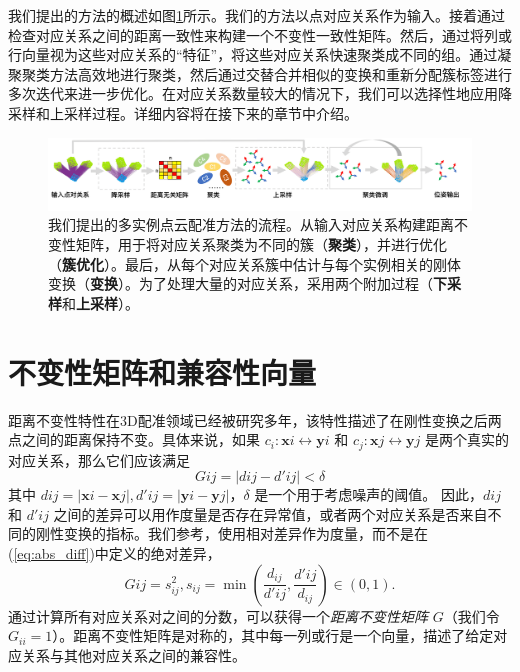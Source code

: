 我们提出的方法的概述如图\ref{fig:pipeline}所示。我们的方法以点对应关系作为输入。接着通过检查对应关系之间的距离一致性来构建一个不变性一致性矩阵。然后，通过将列或行向量视为这些对应关系的“特征”，将这些对应关系快速聚类成不同的组。通过凝聚聚类方法高效地进行聚类，然后通过交替合并相似的变换和重新分配簇标签进行多次迭代来进一步优化。在对应关系数量较大的情况下，我们可以选择性地应用降采样和上采样过程。详细内容将在接下来的章节中介绍。

\begin{figure}[ht]
    \centering
    \includegraphics[width=1\textwidth]{images/pipeline.png} %
    \caption{我们提出的多实例点云配准方法的流程。从输入对应关系构建距离不变性矩阵，用于将对应关系聚类为不同的簇（\textbf{聚类}），并进行优化（\textbf{簇优化}）。最后，从每个对应关系簇中估计与每个实例相关的刚体变换（\textbf{变换}）。为了处理大量的对应关系，采用两个附加过程（\textbf{下采样}和\textbf{上采样}）。}
    \label{fig:pipeline}
    \vspace{-0.6in}
\end{figure}

\section{不变性矩阵和兼容性向量}
\label{subsec:Distance-Consistency-Graph}
距离不变性特性在3D配准领域已经被研究多年\cite{TEASER}\cite{shi2021robin}\cite{leordeanu2005spectral}，该特性描述了在刚性变换之后两点之间的距离保持不变。具体来说，如果 $c_i :\mathbf{x}i \leftrightarrow \mathbf{y}i$ 和 $c_j : \mathbf{x}j \leftrightarrow \mathbf{y}j$ 是两个真实的对应关系，那么它们应该满足
%
\begin{equation}
G{ij}=|d{ij} - d'{ij} | < \delta
\label{eq:abs_diff}
\end{equation}
其中 $d{ij} = |\mathbf{x}i-\mathbf{x}j|, d'{ij}=|\mathbf{y}i -\mathbf{y}j|$，$\delta $ 是一个用于考虑噪声的阈值。
因此，$d{ij}$ 和 $d'{ij}$ 之间的差异可以用作度量是否存在异常值，或者两个对应关系是否来自不同的刚性变换的指标。我们参考\cite{matrix}，使用相对差异作为度量，而不是在(\ref{eq:abs_diff})中定义的绝对差异，
\begin{equation}
G{ij} = s_{ij}^2, s_{ij} = \min( \frac{d_{ij}}{d'{ij}}, \frac{d'{ij}}{d_{ij}}) \in (0, 1).
\end{equation}
通过计算所有对应关系对之间的分数，可以获得一个\emph{距离不变性矩阵} $G$（我们令 $G_{ii} = 1$）。距离不变性矩阵是对称的，其中每一列或行是一个向量，描述了给定对应关系与其他对应关系之间的兼容性\cite{reviewof3dourlierremovingjiaqiYang}。